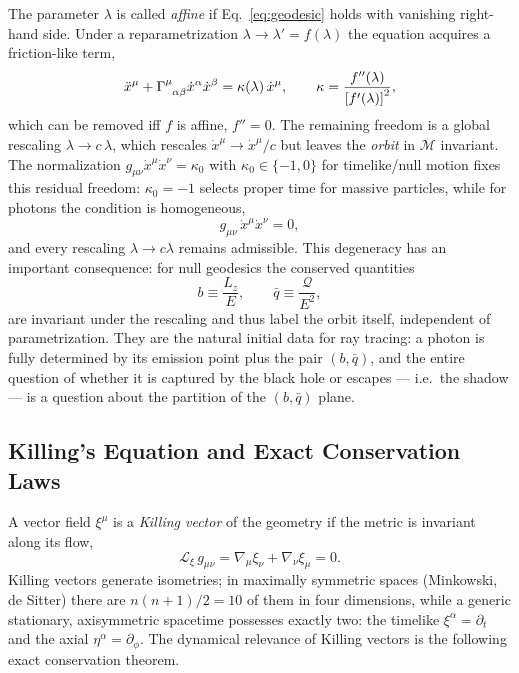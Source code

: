 \documentclass[11pt]{book}
\begin{document}
The parameter $\lambda$ is called \emph{affine} if Eq.~\eqref{eq:geodesic} holds with
vanishing right-hand side. Under a reparametrization $\lambda \to \lambda' =
f(\lambda)$ the equation acquires a friction-like term,
\begin{equation}
    \ddot{x}^\mu + \tensor{\Gamma}{^\mu_{\alpha\beta}}\dot{x}^\alpha\dot{x}^\beta
    = \kappa(\lambda)\, \dot{x}^\mu, \qquad
    \kappa = \frac{f''(\lambda)}{\left[f'(\lambda)\right]^2},
\end{equation}
which can be removed iff $f$ is affine, $f'' = 0$. The remaining freedom is a global
rescaling $\lambda \to c\,\lambda$, which rescales $\dot{x}^\mu \to \dot{x}^\mu/c$ but
leaves the \emph{orbit} in $\mathcal{M}$ invariant. The normalization
 $g_{\mu\nu}\dot{x}^\mu\dot{x}^\nu = \kappa_0$ with $\kappa_0 \in \{-1, 0\}$ for
timelike/null motion fixes this residual freedom: $\kappa_0 = -1$ selects proper time
for massive particles, while for photons the condition is homogeneous,
\begin{equation}
    g_{\mu\nu}\, \dot{x}^\mu \dot{x}^\nu = 0 ,
\end{equation}
and every rescaling $\lambda \to c\lambda$ remains admissible. This degeneracy has an
important consequence: for null geodesics the conserved quantities
\begin{equation}
    b \equiv \frac{L_z}{E}, \qquad \bar{q} \equiv \frac{\mathcal{Q}}{E^2},
\end{equation}
are invariant under the rescaling and thus label the orbit itself, independent of
parametrization. They are the natural initial data for ray tracing: a photon is fully
determined by its emission point plus the pair $(b, \bar{q})$, and the entire question
of whether it is captured by the black hole or escapes --- i.e.\ the shadow --- is a
question about the partition of the $(b, \bar{q})$ plane.


\subsection{Killing's Equation and Exact Conservation Laws}

A vector field $\xi^\mu$ is a \emph{Killing vector} of the geometry if the metric is
invariant along its flow,
\begin{equation}\label{eq:killing_eq}
    \mathcal{L}_\xi\, g_{\mu\nu} = \nabla_\mu \xi_\nu + \nabla_\nu \xi_\mu = 0 .
\end{equation}
Killing vectors generate isometries; in maximally symmetric spaces (Minkowski, de Sitter)
there are $n(n+1)/2 = 10$ of them in four dimensions, while a generic stationary,
axisymmetric spacetime possesses exactly two: the timelike $\xi^\alpha = \partial_t$ and
the axial $\eta^\alpha = \partial_\phi$. The dynamical relevance of Killing vectors is
the following exact conservation theorem.
\end{document}
